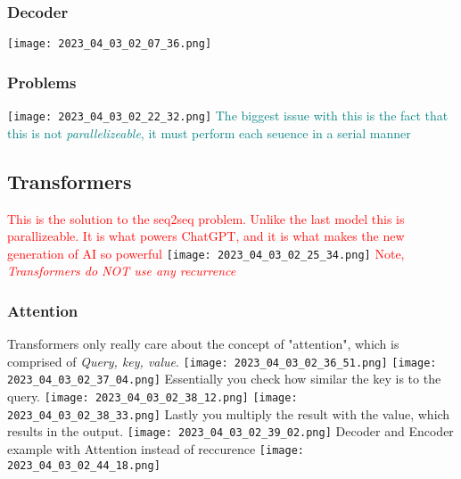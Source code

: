 \documentclass[main.tex,fontsize=8pt,paper=a4,paper=portrait,DIV=calc,]{scrartcl}
\begin{document}
\subsubsection{Decoder}
\texttt{[image: 2023\_04\_03\_02\_07\_36.png]}

\subsubsection{Problems}
\texttt{[image: 2023\_04\_03\_02\_22\_32.png]}\newline
\textcolor{teal}{The biggest issue with this is the fact that this is not \emph{parallelizeable}, it must perform each seuence in a serial manner}

\subsection{Transformers}
\textcolor{red}{This is the solution to the seq2seq problem. Unlike the last model this is parallizeable. \newline
It is what powers ChatGPT, and it is what makes the new generation of AI so powerful}\newline
\texttt{[image: 2023\_04\_03\_02\_25\_34.png]}\newline
\textcolor{red}{Note, \emph{Transformers do NOT use any recurrence}}

\subsubsection{Attention}
Transformers only really care about the concept of "attention", which is comprised of \emph{Query, key, value}.\newline
\texttt{[image: 2023\_04\_03\_02\_36\_51.png]}\newline
\texttt{[image: 2023\_04\_03\_02\_37\_04.png]}\newline
Essentially you check how similar the key is to the query.\newline
\texttt{[image: 2023\_04\_03\_02\_38\_12.png]}\newline
\texttt{[image: 2023\_04\_03\_02\_38\_33.png]}\newline
Lastly you multiply the result with the value, which results in the output.\newline
\texttt{[image: 2023\_04\_03\_02\_39\_02.png]}\newline
Decoder and Encoder example with Attention instead of reccurence\newline
\texttt{[image: 2023\_04\_03\_02\_44\_18.png]}
\end{document}
